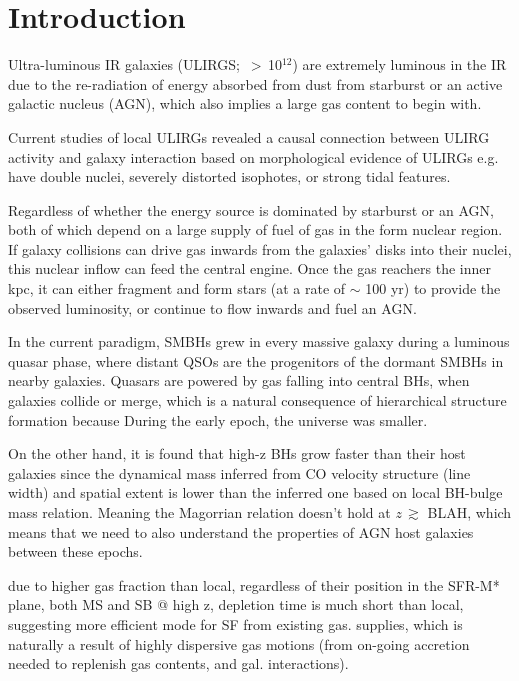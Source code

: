 

  
\section{Introduction}
Ultra-luminous IR galaxies (ULIRGS; \LIR\,$>$\,10$^{12}$\Lsun) are extremely luminous
in the IR due to the re-radiation of energy absorbed from dust from starburst or an active galactic 
nucleus (AGN), which also implies a large gas content to begin with. %

Current studies of local ULIRGs revealed a causal connection between ULIRG activity and galaxy interaction based on morphological evidence of ULIRGs e.g. have double nuclei, severely distorted isophotes, or strong tidal features.

Regardless of whether the energy source is dominated by starburst or an AGN, 
both of which depend on a large supply of fuel of gas 
in the form nuclear region. If galaxy collisions can drive gas inwards from the galaxies' disks into their nuclei, 
this nuclear inflow can feed the 
central engine. Once the gas reachers the inner kpc, it can either fragment and form stars 
(at a rate of $\sim$ 100 \Msun yr\pmOne) to provide the observed luminosity, or continue 
to flow inwards and fuel an AGN.

In the current paradigm, SMBHs grew in every massive galaxy during a luminous quasar phase, where distant QSOs are the 
progenitors of the dormant SMBHs in nearby galaxies. Quasars are powered by gas falling into central BHs, when galaxies 
collide or merge, which is a natural consequence of hierarchical structure formation because During the early epoch, the 
universe was smaller.

On the other hand, it is found that high-z BHs grow faster than their host galaxies since the dynamical mass inferred from CO velocity structure (line width) and spatial extent is lower than the inferred one based on local BH-bulge mass relation.
Meaning the Magorrian relation doesn't hold at $z$\,$\gtrsim$ BLAH, which means that we need to also understand the 
properties of AGN host galaxies between these epochs.

due to higher gas fraction than local, regardless of their position in the SFR-M* plane, both MS and SB @ high z, depletion time is much short than local, suggesting more efficient mode for SF from existing gas.
supplies, which is naturally a result of highly dispersive gas motions (from on-going accretion needed to replenish gas 
contents, and gal. interactions).

